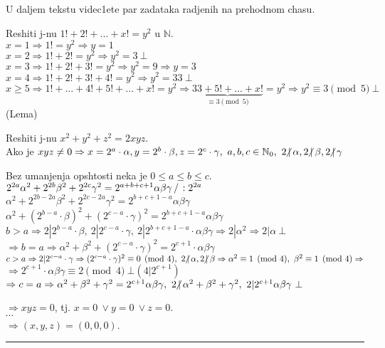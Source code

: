 \documentclass[11pt]{article}
\renewcommand{\qedsymbol}{\rule{0.7em}{0.7em}}
\newcommand{\ndiv}{\hspace{-4pt}\not|\hspace{2pt}}
\begin{document}
U daljem tekstu videc1ete par zadataka radjenih na prehodnom chasu.
\begin{zad} Reshiti j-nu $1!+2!+...+x!=y^2$ u $\mathbb{N}$.\\[2mm]
$x=1\Rightarrow 1!=y^2\Rightarrow y=1$\\
$x=2\Rightarrow 1!+2!=y^2\Rightarrow y^2=3\ \bot$\\
$x=3\Rightarrow 1!+2!+3!=y^2\Rightarrow y^2=9\Rightarrow y=3$\\
$x=4\Rightarrow 1!+2!+3!+4!=y^2\Rightarrow y^2=33\ \bot$\\
$x\geq 5\Rightarrow 1!+...+4!+5!+...+x!=y^2\Rightarrow\underbrace{33+5!+...+x!}_{\equiv 3\pmod{5}}=y^2\Rightarrow y^2\equiv 3\pmod{5}\ \bot$(Lema)\\
\end{zad}

\newpage
\begin{zad} Reshiti j-nu $x^2+y^2+z^2=2xyz$.\\[2mm]
Ako je $xyz\neq 0\Rightarrow x=2^a\cdot\alpha, y=2^b\cdot\beta, z=2^c\cdot\gamma,\ a,b,c\in\mathbb{N}_0,\ 2\ndiv\alpha,2\ndiv\beta,2\ndiv\gamma$\\
\begin{adjustwidth}{0.25\linewidth}{}
Bez umanjenja opshtosti neka je $0\leq a\leq b\leq c$.\\
$2^{2a}\alpha^2+2^{2b}\beta^2+2^{2c}\gamma^2=2^{a+b+c+1}\alpha\beta\gamma\left/\right. :2^{2a}$\\
$\alpha^2+2^{2b-2a}\beta^2+2^{2c-2a}\gamma^2=2^{b+c+1-a}\alpha\beta\gamma$\\
$\alpha^2+(2^{b-a}\cdot\beta)^2+(2^{c-a}\cdot\gamma)^2=2^{b+c+1-a}\alpha\beta\gamma$\\
$b>a\Rightarrow 2|2^{b-a}\cdot\beta,\ 2|2^{c-a}\cdot\gamma,\ 2|2^{b+c+1-a}\cdot\alpha\beta\gamma\Rightarrow 2|\alpha^2\Rightarrow 2|\alpha\ \bot$\\
$\Rightarrow b=a\Rightarrow\alpha^2+\beta^2+(2^{c-a}\cdot\gamma)^2=2^{c+1}\cdot\alpha\beta\gamma$\\
$c>a\Rightarrow 2|2^{c-a}\cdot\gamma\Rightarrow (2^{c-a}\cdot\gamma)^2\equiv 0\pmod{4},\ 2\ndiv\alpha,2\ndiv\beta\Rightarrow \alpha^2\equiv 1\pmod{4},\  \beta^2\equiv 1\pmod{4}\Rightarrow$\\
$\Rightarrow 2^{c+1}\cdot\alpha\beta\gamma\equiv 2 \pmod{4}\ \bot(4|2^{c+1})$\\
$\Rightarrow c=a\Rightarrow \alpha^2+\beta^2+\gamma^2=2^{c+1}\alpha\beta\gamma,\ 2\ndiv\alpha^2+\beta^2+\gamma^2,\ 2|2^{c+1}\alpha\beta\gamma\ \bot$\\
\end{adjustwidth}
$\Rightarrow xyz=0$, tj. $x=0\ \lor y=0\ \lor z=0$.\\
$\cdots$\\
$\Rightarrow (x,y,z)=(0,0,0)$. \qedsymbol
\end{zad}
\end{document}
